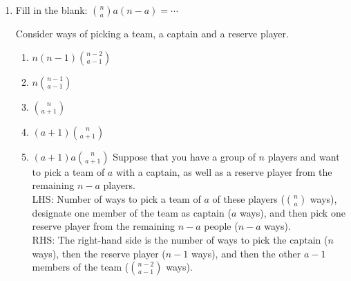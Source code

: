 \documentclass[11pt,preview]{standalone} %
\begin{document}
\begin{enumerate}
\item Fill in the blank:
$\binom{n}{a} a(n - a)= \cdots$ 

\begin{Multi}
\Hint Consider ways of picking a team, a captain and a reserve player. 
\begin{enumerate}

\TrueChoice\item $n(n - 1)\binom{n - 2}{a - 1}$
\FalseChoice\item $n \binom{n - 1}{a - 1}$
\FalseChoice\item $\binom{n}{a+1}$
\FalseChoice\item $(a+1)\binom{n}{a+1}$
\TrueChoice\item $(a+1)a \binom{n}{a+1}$
\Solution Suppose that you have a group of $n$ players and want to pick a team of $a$ with a captain, as well as a reserve player from the remaining $n-a$ players. \\
LHS: Number of ways to pick a team of $a$ of these players ($\binom{n}{a} $ ways), designate 
one member of the team as captain ($a$ ways), and then pick one reserve player 
from the remaining $n - a$ people ($n-a$ ways). \\
RHS: The right-hand side is the number of ways to pick the captain ($n$ ways), then the reserve player ($n-1$ ways), and then the 
other $a - 1$ members of the team ($\binom{n - 2}{a - 1}$ ways).
\end{enumerate}
\end{Multi}



\end{enumerate}
\end{document}

